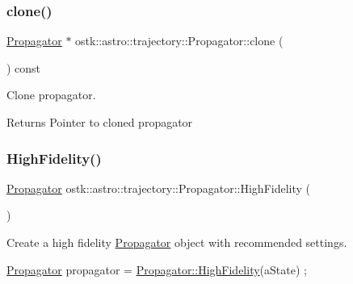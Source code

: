 \subsubsection{\texorpdfstring{clone()}{clone()}}
{\footnotesize\ttfamily \hyperlink{classostk_1_1astro_1_1trajectory_1_1_propagator}{Propagator} $\ast$ ostk\+::astro\+::trajectory\+::\+Propagator\+::clone (\begin{DoxyParamCaption}{ }\end{DoxyParamCaption}) const}



Clone propagator. 

\begin{DoxyReturn}{Returns}
Pointer to cloned propagator 
\end{DoxyReturn}
\mbox{\label{classostk_1_1astro_1_1trajectory_1_1_propagator_ae49a22d28386d71da700c80b9a766983}} 
\subsubsection{\texorpdfstring{High\+Fidelity()}{HighFidelity()}}
{\footnotesize\ttfamily \hyperlink{classostk_1_1astro_1_1trajectory_1_1_propagator}{Propagator} ostk\+::astro\+::trajectory\+::\+Propagator\+::\+High\+Fidelity (\begin{DoxyParamCaption}{ }\end{DoxyParamCaption})\hspace{0.3cm}{\ttfamily [static]}}



Create a high fidelity \hyperlink{classostk_1_1astro_1_1trajectory_1_1_propagator}{Propagator} object with recommended settings. 


\begin{DoxyCode}
\hyperlink{classostk_1_1astro_1_1trajectory_1_1_propagator_a3e3802b0eaa96a0e9422db11a7deac16}{Propagator} propagator = \hyperlink{classostk_1_1astro_1_1trajectory_1_1_propagator_ae49a22d28386d71da700c80b9a766983}{Propagator::HighFidelity}(aState) ;
\end{DoxyCode}
 
